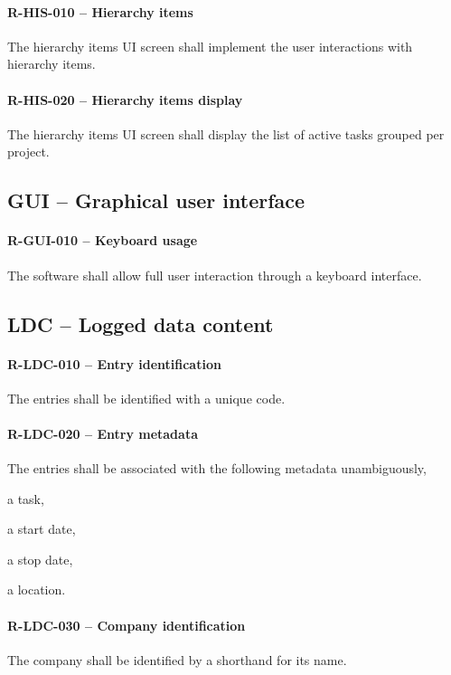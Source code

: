\paragraph{R-HIS-010 -- Hierarchy items}
The hierarchy items \gls{UI} screen shall implement the user interactions with
hierarchy items.

\paragraph{R-HIS-020 -- Hierarchy items display}
The hierarchy items \gls{UI} screen shall display the list of active tasks
grouped per project.

\subsection{GUI -- Graphical user interface}
\paragraph{R-GUI-010 -- Keyboard usage}
The software shall allow full user interaction through a keyboard interface.

\subsection{LDC -- Logged data content}
\paragraph{R-LDC-010 -- Entry identification}
The entries shall be identified with a unique code.

\paragraph{R-LDC-020 -- Entry metadata}
The entries shall be associated with the following metadata unambiguously,
\begin{compactitem}
\item a task,
\item a start date,
\item a stop date,
\item a location.
\end{compactitem}

\paragraph{R-LDC-030 -- Company identification}
The company shall be identified by a shorthand for its name.

